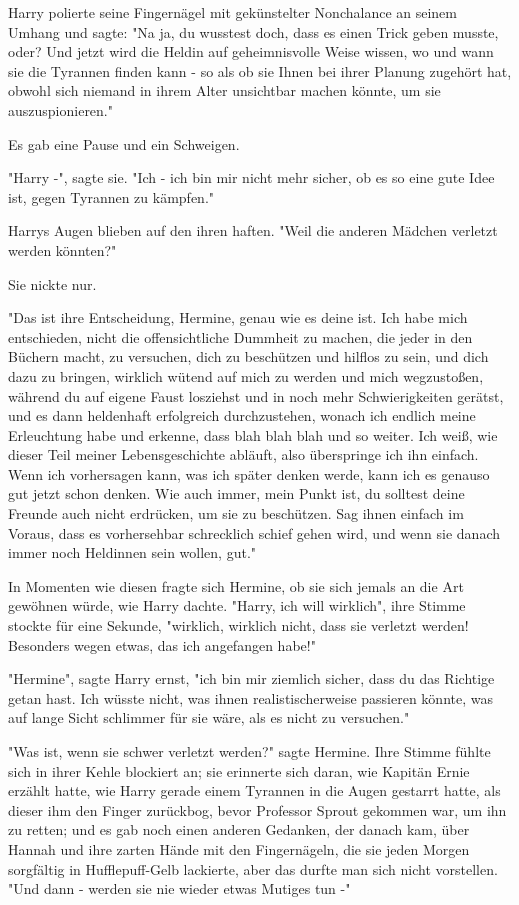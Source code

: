 {Harry polierte seine Fingernägel mit gekünstelter Nonchalance an seinem Umhang und sagte: "Na ja, du wusstest doch, dass es einen Trick geben musste, oder? Und jetzt wird die Heldin auf geheimnisvolle Weise wissen, wo und wann sie die Tyrannen finden kann - so als ob sie Ihnen bei ihrer Planung zugehört hat, obwohl sich niemand in ihrem Alter unsichtbar machen könnte, um sie auszuspionieren."

Es gab eine Pause und ein Schweigen.

"Harry -", sagte sie. "Ich - ich bin mir nicht mehr sicher, ob es so eine gute Idee ist, gegen Tyrannen zu kämpfen."

Harrys Augen blieben auf den ihren haften. "Weil die anderen Mädchen verletzt werden könnten?"

Sie nickte nur.

"Das ist ihre Entscheidung, Hermine, genau wie es deine ist. Ich habe mich entschieden, nicht die offensichtliche Dummheit zu machen, die jeder in den Büchern macht, zu versuchen, dich zu beschützen und hilflos zu sein, und dich dazu zu bringen, wirklich wütend auf mich zu werden und mich wegzustoßen, während du auf eigene Faust losziehst und in noch mehr Schwierigkeiten gerätst, und es dann heldenhaft erfolgreich durchzustehen, wonach ich endlich meine Erleuchtung habe und erkenne, dass blah blah blah und so weiter. Ich weiß, wie dieser Teil meiner Lebensgeschichte abläuft, also überspringe ich ihn einfach. Wenn ich vorhersagen kann, was ich später denken werde, kann ich es genauso gut jetzt schon denken. Wie auch immer, mein Punkt ist, du solltest deine Freunde auch nicht erdrücken, um sie zu beschützen. Sag ihnen einfach im Voraus, dass es vorhersehbar schrecklich schief gehen wird, und wenn sie danach immer noch Heldinnen sein wollen, gut."

In Momenten wie diesen fragte sich Hermine, ob sie sich jemals an die Art gewöhnen würde, wie Harry dachte. "Harry, ich will wirklich", ihre Stimme stockte für eine Sekunde, "wirklich, wirklich nicht, dass sie verletzt werden! Besonders wegen etwas, das ich angefangen habe!"

"Hermine", sagte Harry ernst, "ich bin mir ziemlich sicher, dass du das Richtige getan hast. Ich wüsste nicht, was ihnen realistischerweise passieren könnte, was auf lange Sicht schlimmer für sie wäre, als es nicht zu versuchen."

"Was ist, wenn sie schwer verletzt werden?" sagte Hermine. Ihre Stimme fühlte sich in ihrer Kehle blockiert an; sie erinnerte sich daran, wie Kapitän Ernie erzählt hatte, wie Harry gerade einem Tyrannen in die Augen gestarrt hatte, als dieser ihm den Finger zurückbog, bevor Professor Sprout gekommen war, um ihn zu retten; und es gab noch einen anderen Gedanken, der danach kam, über Hannah und ihre zarten Hände mit den Fingernägeln, die sie jeden Morgen sorgfältig in Hufflepuff-Gelb lackierte, aber das durfte man sich nicht vorstellen. "Und dann - werden sie nie wieder etwas Mutiges tun -"

}

